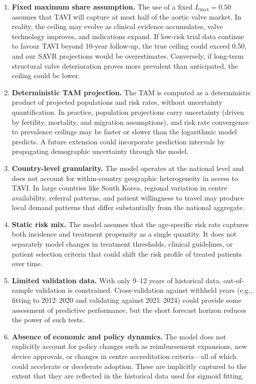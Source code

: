 \documentclass[12pt, a4paper]{article}
\begin{document}
\begin{enumerate}[leftmargin=*, itemsep=4pt]
    \item \textbf{Fixed maximum share assumption.} The use of a fixed $L_{\max} = 0.50$ assumes that TAVI will capture at most half of the aortic valve market. In reality, the ceiling may evolve as clinical evidence accumulates, valve technology improves, and indications expand. If low-risk trial data continue to favour TAVI beyond 10-year follow-up, the true ceiling could exceed 0.50, and our SAVR projections would be overestimates. Conversely, if long-term structural valve deterioration proves more prevalent than anticipated, the ceiling could be lower.

    \item \textbf{Deterministic TAM projection.} The TAM is computed as a deterministic product of projected populations and risk rates, without uncertainty quantification. In practice, population projections carry uncertainty (driven by fertility, mortality, and migration assumptions), and risk rate convergence to prevalence ceilings may be faster or slower than the logarithmic model predicts. A future extension could incorporate prediction intervals by propagating demographic uncertainty through the model.

    \item \textbf{Country-level granularity.} The model operates at the national level and does not account for within-country geographic heterogeneity in access to TAVI. In large countries like South Korea, regional variation in centre availability, referral patterns, and patient willingness to travel may produce local demand patterns that differ substantially from the national aggregate.

    \item \textbf{Static risk mix.} The model assumes that the age-specific risk rate captures both incidence and treatment propensity as a single quantity. It does not separately model changes in treatment thresholds, clinical guidelines, or patient selection criteria that could shift the risk profile of treated patients over time.

    \item \textbf{Limited validation data.} With only 9--12 years of historical data, out-of-sample validation is constrained. Cross-validation against withheld years (e.g., fitting to 2012--2020 and validating against 2021--2024) could provide some assessment of predictive performance, but the short forecast horizon reduces the power of such tests.

    \item \textbf{Absence of economic and policy dynamics.} The model does not explicitly account for policy changes such as reimbursement expansions, new device approvals, or changes in centre accreditation criteria---all of which could accelerate or decelerate adoption. These are implicitly captured to the extent that they are reflected in the historical data used for sigmoid fitting.
\end{enumerate}
\end{document}
